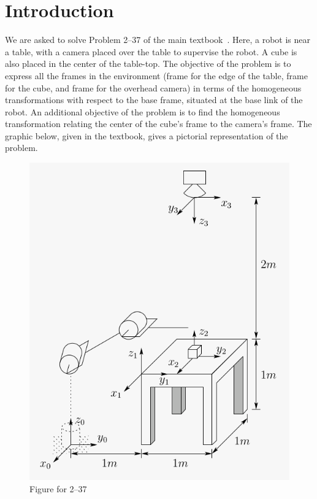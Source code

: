 \documentclass[conference]{IEEEtran}
\begin{document}
\section{Introduction}
We are asked to solve Problem 2--37 of the main textbook~\cite{Spong2006}. Here,
a robot is near a table, with a camera placed over the table to supervise the
robot. A cube is also placed in the center of the table-top. 
The objective of the problem is to express all the frames in the environment
(frame for the edge of the table, frame for the cube,
and frame for the overhead camera) in terms of the homogeneous transformations with
respect to the base frame, situated at the base link of the robot. An additional
objective of the problem is to find the homogeneous transformation relating
the center of the cube's frame to the camera's frame. The graphic below, given
in the textbook, gives a pictorial representation of the problem.
\begin{figure}[h]
    \centering
    \includegraphics[scale=0.4]{./prob3-37-fig.png}
    \caption{Figure for 2--37}
\end{figure}
\end{document}
